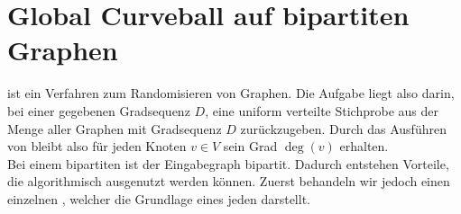 \section{Global Curveball auf bipartiten Graphen}
\label{sec:global_curveball}
\gc{} ist ein Verfahren zum Randomisieren von Graphen.
Die Aufgabe liegt also darin, bei einer gegebenen Gradsequenz $D$, eine uniform verteilte Stichprobe
aus der Menge aller Graphen mit Gradsequenz $D$ zurückzugeben. Durch das Ausführen von \gc{} 
bleibt also für jeden Knoten $v\in V$ sein Grad $\deg(v)$ erhalten. 
\\
Bei einem bipartiten \gc{} ist der Eingabegraph bipartit. Dadurch entstehen 
Vorteile, die algorithmisch ausgenutzt werden können. Zuerst behandeln wir jedoch einen einzelnen \cb{}, welcher
die Grundlage eines jeden \gc{} darstellt.
\\

